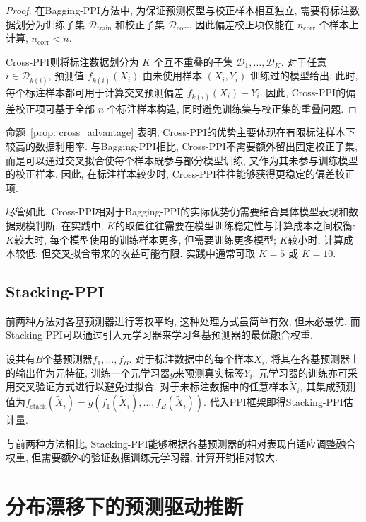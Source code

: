 \documentclass[a4paper, AutoFakeBold, UTF8]{ctexrep}
\theoremstyle{plain}
\numberwithin{equation}{chapter}
\begin{document}
\begin{proof}
在Bagging-PPI方法中, 为保证预测模型与校正样本相互独立, 需要将标注数据划分为训练子集 $\mathcal{D}_{\mathrm{train}}$ 和校正子集 $\mathcal{D}_{\mathrm{corr}}$, 因此偏差校正项仅能在 $n_{\mathrm{corr}}$ 个样本上计算, $n_{\mathrm{corr}}<n$. 

Cross-PPI则将标注数据划分为 $K$ 个互不重叠的子集 $\mathcal{D}_1, \ldots, \mathcal{D}_K$. 对于任意 $i\in\mathcal{D}_{k (i) }$, 预测值 $f_{k (i) } (X_i) $ 由未使用样本 $ (X_i, Y_i) $ 训练过的模型给出. 此时, 每个标注样本都可用于计算交叉预测偏差
$f_{k (i) } (X_i) -Y_i$. 因此, Cross-PPI的偏差校正项可基于全部 $n$ 个标注样本构造, 同时避免训练集与校正集的重叠问题. 
\end{proof}

命题~\ref{prop: cross_advantage} 表明, Cross-PPI的优势主要体现在有限标注样本下较高的数据利用率. 与Bagging-PPI相比, Cross-PPI不需要额外留出固定校正子集, 而是可以通过交叉拟合使每个样本既参与部分模型训练, 又作为其未参与训练模型的校正样本. 因此, 在标注样本较少时, Cross-PPI往往能够获得更稳定的偏差校正项. 

尽管如此, Cross-PPI相对于Bagging-PPI的实际优势仍需要结合具体模型表现和数据规模判断. 在实践中, $K$的取值往往需要在模型训练稳定性与计算成本之间权衡: $K$较大时, 每个模型使用的训练样本更多, 但需要训练更多模型; $K$较小时, 计算成本较低, 但交叉拟合带来的收益可能有限. 实践中通常可取 $K=5$ 或 $K=10$. 

\subsection{Stacking-PPI}

前两种方法对各基预测器进行等权平均, 这种处理方式虽简单有效, 但未必最优. 而Stacking-PPI可以通过引入元学习器来学习各基预测器的最优融合权重. 

设共有$B$个基预测器$f_1, \ldots, f_B$. 对于标注数据中的每个样本$X_i$, 将其在各基预测器上的输出作为元特征, 训练一个元学习器$g$来预测真实标签$Y_i$. 元学习器的训练亦可采用交叉验证方式进行以避免过拟合. 对于未标注数据中的任意样本$\tilde{X}_i$, 其集成预测值为$\bar{f}_{\text{stack}} (\tilde{X}_i)  = g (f_1 (\tilde{X}_i), \ldots, f_B (\tilde{X}_i) ) $. 代入PPI框架即得Stacking-PPI估计量. 

与前两种方法相比, Stacking-PPI能够根据各基预测器的相对表现自适应调整融合权重, 但需要额外的验证数据训练元学习器, 计算开销相对较大. 



\section{分布漂移下的预测驱动推断}
\end{document}
